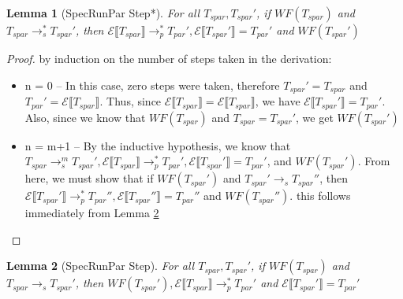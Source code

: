 \documentclass[9pt]{article}
\newtheorem{lemma}{Lemma}
\newcommand\specStep{\rightarrow_{s}}
\newcommand\parStep{\rightarrow_{p}}
\newcommand{\erase}[1]{\mathcal{E}\llbracket #1 \rrbracket}
\begin{document}
\begin{lemma}[SpecRunPar Step*]
\label{specRunParStepStar}
For all $T_{spar}, T_{spar}'$, if $WF(T_{spar})$ and $T_{spar} \specStep^* T_{spar}'$, then $\mathcal{E}\llbracket T_{spar}\rrbracket \parStep^* T_{par}', \erase{T_{spar}'} = T_{par}' $ and $WF(T_{spar}')$

\end{lemma}

\begin{proof}
by induction on the number of steps taken in the derivation:
\begin{itemize}
\item n = 0 -- In this case, zero steps were taken, therefore $T_{spar}' = T_{spar}$ and $T_{par}' = \erase{T_{spar}}$.  Thus, since $\erase{T_{spar}}  = \erase{T_{spar}}$, we have $\erase{T_{spar}'} = T_{par}'$.  Also, since we know that $WF(T_{spar})$ and $T_{spar} = T_{spar}'$, we get $WF(T_{spar}')$

\item n = m+1 -- By the inductive hypothesis, we know that $T_{spar} \specStep^m T_{spar}', \erase{T_{spar}} \parStep^* T_{par}', \erase{T_{spar}'} = T_{par}'$, and $WF(T_{spar}')$.  From here, we must show that if $WF(T_{spar}')$ and $T_{spar}' \specStep T_{spar}''$, then $\erase{T_{spar}'} \parStep^* T_{par}'', \erase{T_{spar}''} = T_{par}''$ and $WF(T_{spar}'')$.  this follows immediately from Lemma \ref{specRunParStep}
\end{itemize}
\end{proof}

\begin{lemma}[SpecRunPar Step]
\label{specRunParStep}
For all $T_{spar}, T_{spar}'$, if $WF(T_{spar})$ and $T_{spar} \specStep T_{spar}'$, then $WF(T_{spar}'), \erase{T_{spar}} \parStep^* T_{par}'$ and $\erase{T_{spar}'} = T_{par}' $

\end{lemma}
\end{document}
